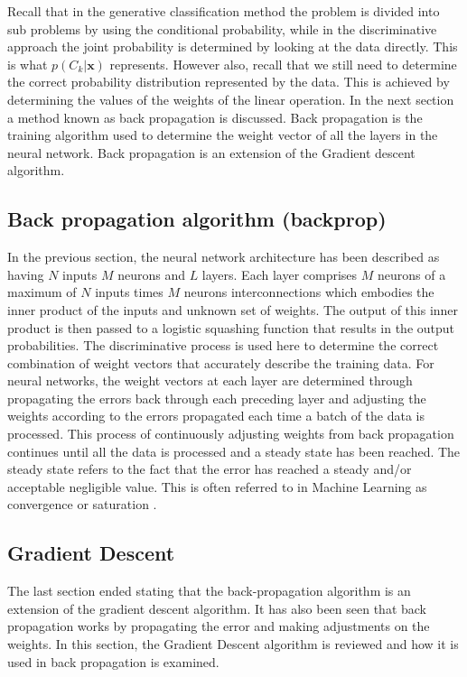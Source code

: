 Recall that in the generative classification method the problem is divided into sub problems by using the conditional probability, while in the discriminative approach the joint probability is determined by looking at the data directly.  This is what $p(C_k|\mathbf{x})$ represents.  However also, recall that we still need to determine the correct probability distribution represented by the data.  This is achieved by determining the values of the weights of the linear operation.  In the next section a method known as back propagation is discussed.  Back propagation is the training algorithm used to determine the weight vector of all the layers in the neural network.  Back propagation is an extension of the Gradient descent algorithm.

\subsection{Back propagation algorithm (backprop)}
In the previous section, the neural network architecture has been described as having $N$ inputs $M$ neurons and $L$ layers. Each layer comprises $M$ neurons of a maximum of $N$ inputs times $M$ neurons interconnections which embodies the inner product of the inputs and unknown set of weights. The output of this inner product is then passed to a logistic squashing function that results in the output probabilities.  The discriminative process is used here to determine the correct combination of weight vectors that accurately describe the training data.  For neural networks, the weight vectors at each layer are determined through propagating the errors back through each preceding layer and adjusting the weights according to the errors propagated each time a batch of the data is processed.  This process of continuously adjusting weights from back propagation continues until all the data is processed and a steady state has been reached.  The steady state refers to the fact that the error has reached a steady and/or acceptable negligible value.  This is often referred to in Machine Learning as convergence or saturation \citep{boden2002guide}.

\subsection{Gradient Descent}
The last section ended stating that the back-propagation algorithm is an extension of the gradient descent algorithm.  It has also been seen that back propagation works by propagating the error and making adjustments on the weights.  In this section, the Gradient Descent algorithm is reviewed and how it is used in back propagation is examined.  

